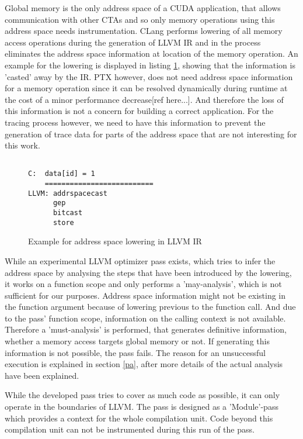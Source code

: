 Global memory is the only address space of a CUDA application, that allows communication with other CTAs and so only memory operations using this address space needs instrumentation. CLang performs lowering of all memory access operations during the generation of LLVM IR and in the process eliminates the address space information
at location of the memory operation. An example for the lowering is displayed in listing \ref{lowering}, showing
that the information is 'casted' away by the IR. PTX however, does not need address space information for a memory operation since it can be resolved dynamically during runtime at the cost of a minor performance decrease[ref here...]. And therefore the loss of this information is not a concern for building a correct application. For the tracing process however, we need to have this information to prevent the generation of trace data for parts of the address space that are not interesting for this work.

\begin{figure}
	\begin{lstlisting}[style=C]

C:	data[id] = 1
	==========================
LLVM: addrspacecast
	  gep
	  bitcast
	  store
	\end{lstlisting}
	\caption{Example for address space lowering in LLVM IR}
	\label{lowering}
\end{figure}

While an experimental LLVM optimizer pass exists, which tries to infer the address space by analysing the steps
that have been introduced by the lowering, it works on a function scope and only performs a 'may-analysis', which is not sufficient for our purposes. Address space information  might not be existing in the function argument because of lowering previous to the function call. And due to the pass' function scope, information on the calling context is not available.
Therefore a 'must-analysis' is performed, that generates definitive information, whether a memory access targets
global memory or not. If generating this information is not possible, the pass fails. The reason for an unsuccessful execution is  explained in section \ref{pa}, after more details of the actual analysis have been
explained.

While the developed pass tries to cover as much code as possible, it can only operate in the boundaries of 
LLVM. The pass is designed as a 'Module'-pass which provides a context for the whole compilation unit. Code beyond this compilation unit can not be instrumented during this run of the pass.


